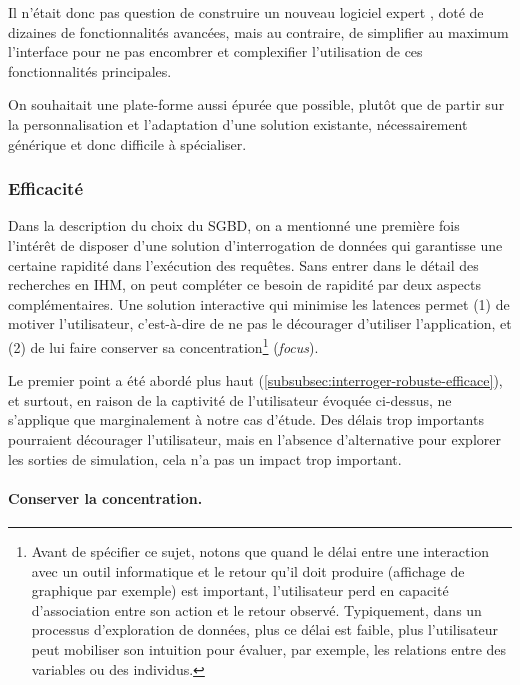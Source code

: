Il n'était donc pas question de construire un nouveau \og logiciel expert \fg{}, doté de dizaines de fonctionnalités avancées, mais au contraire, de simplifier au maximum l'interface pour ne pas encombrer et complexifier l'utilisation de ces fonctionnalités principales.

On souhaitait une plate-forme aussi épurée que possible, plutôt que de partir sur la personnalisation et l'adaptation d'une solution existante, nécessairement générique et donc difficile à spécialiser.


\subsubsection{Efficacité}

Dans la description du choix du SGBD, on a mentionné une première fois l'intérêt de disposer d'une solution d'interrogation de données qui garantisse une certaine rapidité dans l'exécution des requêtes.
Sans entrer dans le détail des recherches en IHM, on peut compléter ce besoin de rapidité par deux aspects complémentaires.
Une solution interactive qui minimise les latences permet (1) de motiver l'utilisateur, c'est-à-dire de ne pas le décourager d'utiliser l'application, et (2) de lui faire conserver sa concentration\footnote{
	Avant de spécifier ce sujet, notons que quand le délai entre une interaction avec un outil informatique et le retour qu'il doit produire (affichage de graphique par exemple) est important, l'utilisateur perd en capacité d'association entre son action et le retour observé.
	Typiquement, dans un processus d'exploration de données, plus ce délai est faible, plus l'utilisateur peut mobiliser son intuition pour évaluer, par exemple, les relations entre des variables ou des individus.
} (\textit{focus}).

Le premier point a été abordé plus haut (\cref{subsubsec:interroger-robuste-efficace}), et surtout, en raison de la \og captivité\fg{} de l'utilisateur évoquée ci-dessus, ne s'applique que marginalement à notre cas d'étude.
Des délais trop importants pourraient décourager l'utilisateur, mais en l'absence d'alternative pour explorer les sorties de simulation, cela n'a pas un impact trop important.

\paragraph{Conserver la concentration.}

